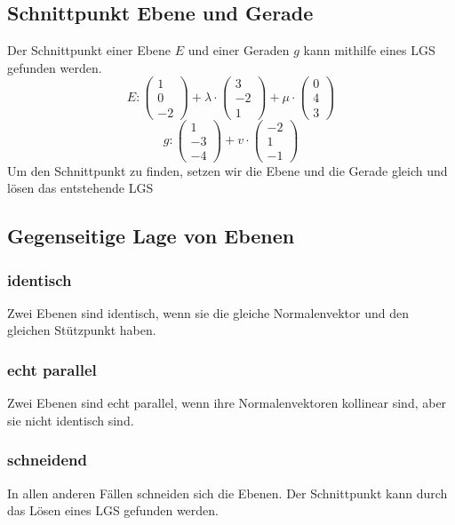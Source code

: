 \documentclass{article}
\begin{document}
\begin{minipage}[t]{0.45\textwidth}
    \subsection*{Schnittpunkt Ebene und Gerade}
    Der Schnittpunkt einer Ebene \( E \) und einer Geraden \( g \) kann mithilfe eines LGS gefunden werden. 
    \begin{equation*}
        E: \begin{pmatrix}
            1 \\
            0 \\
            -2
        \end{pmatrix} + \lambda \cdot \begin{pmatrix}
            3 \\
            -2 \\
            1
        \end{pmatrix} + \mu \cdot \begin{pmatrix}
            0 \\
            4 \\
            3
        \end{pmatrix}
    \end{equation*}
    \begin{equation*}
        g: \begin{pmatrix}
            1 \\
            -3 \\
            -4
            \end{pmatrix} + v \cdot \begin{pmatrix}
                -2 \\
                1 \\
                -1
            \end{pmatrix}
    \end{equation*}
    Um den Schnittpunkt zu finden, setzen wir die Ebene und die Gerade gleich und lösen das entstehende LGS

    \subsection*{Gegenseitige Lage von Ebenen}
    \subsubsection*{identisch}
    Zwei Ebenen sind identisch, wenn sie die gleiche Normalenvektor und den gleichen Stützpunkt haben.

    \subsubsection*{echt parallel}
    Zwei Ebenen sind echt parallel, wenn ihre Normalenvektoren kollinear sind, aber sie nicht identisch sind.
    
    \subsubsection*{schneidend}
    In allen anderen Fällen schneiden sich die Ebenen. Der Schnittpunkt kann durch das Lösen eines LGS gefunden werden.
\end{minipage}
\end{document}
